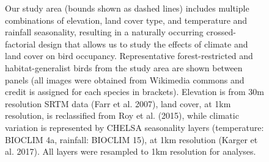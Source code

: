 \begin{figure}[h!]
{        Our study area (bounds shown as dashed lines) includes multiple combinations of elevation, land cover type, and temperature and rainfall seasonality, resulting in a naturally occurring crossed-factorial design that allows us to study the effects of climate and land cover on bird occupancy. 
        Representative forest-restricted and habitat-generalist birds from the study area are shown between panels (all images were obtained from Wikimedia commons and credit is assigned for each species in brackets).
        Elevation is from 30m resolution SRTM data (Farr et al. 2007), land cover, at 1km resolution, is reclassified from Roy et al. (2015), while climatic variation is represented by CHELSA seasonality layers (temperature: BIOCLIM 4a, rainfall: BIOCLIM 15), at 1km resolution (Karger et al. 2017). All layers were resampled to 1km resolution for analyses.
    }
    \label{hilly_fig_01}
\end{figure}

